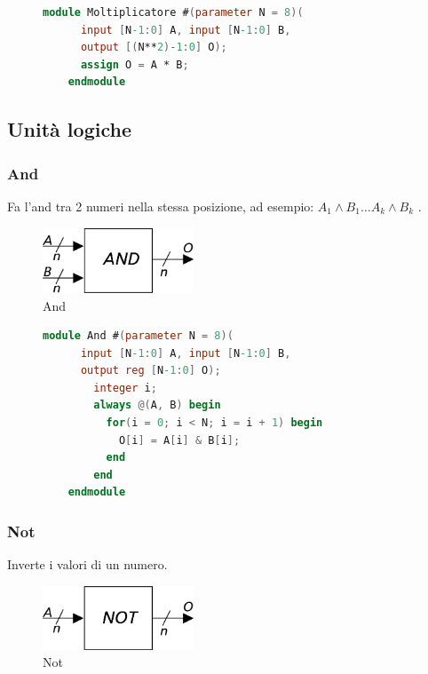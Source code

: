 \documentclass[a4paper]{article}
\theoremstyle{break}
\theoremstyle{break}
\theoremstyle{break}
\theoremstyle{break}
\begin{document}
\begin{figure}[H]
  \begin{lstlisting}[language=Verilog]
    module Moltiplicatore #(parameter N = 8)(
      input [N-1:0] A, input [N-1:0] B,
      output [(N**2)-1:0] O);
      assign O = A * B;
    endmodule
  \end{lstlisting}
\end{figure}


\subsection{Unità logiche}
\subsubsection{And}
Fa l'and tra 2 numeri nella stessa posizione, ad esempio: \( A_1 \wedge B_1 \ldots A_k \wedge B_k \) .
\begin{figure}[H]
  \begin{center}
    \includegraphics[width=0.40\textwidth]{figures/and}
  \end{center}
  \caption{And}
\end{figure}

\begin{figure}[H]
  \begin{lstlisting}[language=Verilog]
    module And #(parameter N = 8)(
      input [N-1:0] A, input [N-1:0] B,
      output reg [N-1:0] O);
        integer i;
        always @(A, B) begin
          for(i = 0; i < N; i = i + 1) begin
            O[i] = A[i] & B[i];
          end
        end
    endmodule
  \end{lstlisting}
\end{figure}

\subsubsection{Not}
Inverte i valori di un numero.
\begin{figure}[H]
  \begin{center}
    \includegraphics[width=0.40\textwidth]{figures/not}
  \end{center}
  \caption{Not}
\end{figure}
\end{document}
